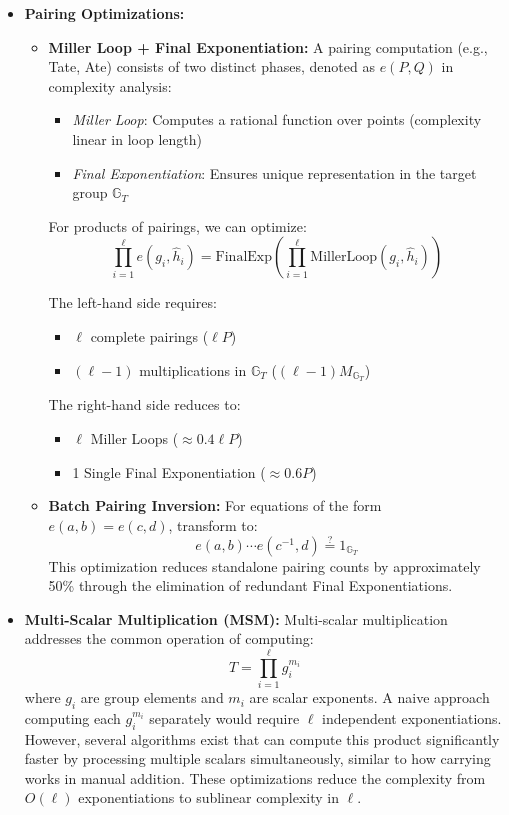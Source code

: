 \begin{itemize}
    \item \textbf{Pairing Optimizations:}
    \begin{itemize}
        \item \textbf{Miller Loop + Final Exponentiation:} 
        A pairing computation (e.g., Tate, Ate) consists of two distinct phases, denoted as $e(P,Q)$ in complexity analysis:
        \begin{itemize}
            \item \textit{Miller Loop}: Computes a rational function over points (complexity linear in loop length)
            \item \textit{Final Exponentiation}: Ensures unique representation in the target group $\mathbb{G}_T$
        \end{itemize}
        
        For products of pairings, we can optimize:
        \[
        \prod_{i=1}^\ell e(g_i, \hat{h}_i) = \text{FinalExp}\left(\prod_{i=1}^\ell \text{MillerLoop}(g_i, \hat{h}_i)\right)
        \]
        
        \noindent The left-hand side requires:
        \begin{itemize}
            \item $\ell$ complete pairings ($\ell P$)
            \item $(\ell-1)$ multiplications in $\mathbb{G}_T$ ($(\ell-1)M_{\mathbb{G}_T}$)
        \end{itemize}
        
        \noindent The right-hand side reduces to:
        \begin{itemize}
            \item $\ell$ Miller Loops ($\approx 0.4\ell P$)
            \item 1 Single Final Exponentiation ($\approx 0.6P$)
        \end{itemize}
        
        \item \textbf{Batch Pairing Inversion:} For equations of the form $e(a,b) = e(c,d)$, transform to:
        \[
        e(a,b) \cdots e(c^{-1},d) \stackrel{?}{=} 1_{\mathbb{G}_T}
        \]
        This optimization reduces standalone pairing counts by approximately 50\% through the elimination of redundant Final Exponentiations.
    \end{itemize}
    
    \item \textbf{Multi-Scalar Multiplication (MSM):}
        Multi-scalar multiplication addresses the common operation of computing:
        \[
            T = \prod_{i=1}^\ell g_i^{m_i}
        \]
        where $g_i$ are group elements and $m_i$ are scalar exponents. A naive approach computing each $g_i^{m_i}$ separately would require $\ell$ independent exponentiations. However, several algorithms exist that can compute this product significantly faster by processing multiple scalars simultaneously, similar to how carrying works in manual addition. These optimizations reduce the complexity from $O(\ell)$ exponentiations to sublinear complexity in $\ell$.
        


\end{itemize}
